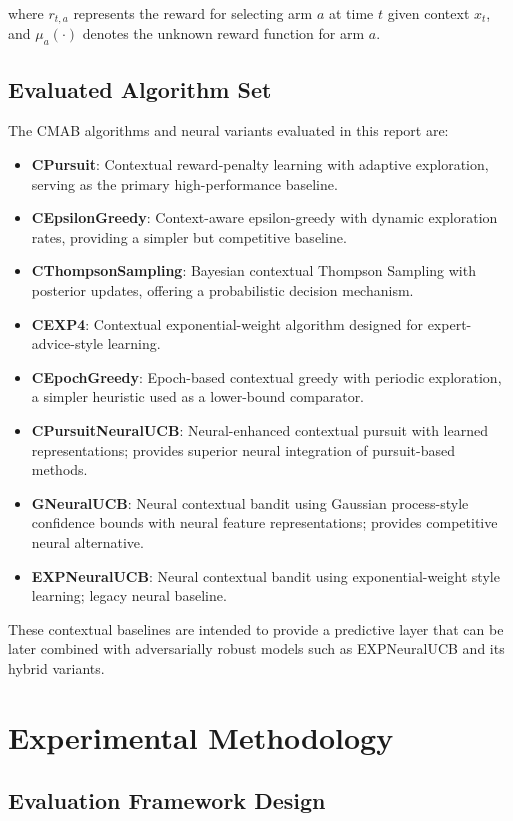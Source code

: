 \documentclass[12pt,a4paper]{article}
\begin{document}
where $r_{t,a}$ represents the reward for selecting arm $a$ at time $t$ given context $x_t$, and $\mu_a(\cdot)$ denotes the unknown reward function for arm $a$.

\subsection{Evaluated Algorithm Set}

The CMAB algorithms and neural variants evaluated in this report are:

\begin{itemize}
\item \textbf{CPursuit}: Contextual reward-penalty learning with adaptive exploration, serving as the primary high-performance baseline.
\item \textbf{CEpsilonGreedy}: Context-aware epsilon-greedy with dynamic exploration rates, providing a simpler but competitive baseline.
\item \textbf{CThompsonSampling}: Bayesian contextual Thompson Sampling with posterior updates, offering a probabilistic decision mechanism.
\item \textbf{CEXP4}: Contextual exponential-weight algorithm designed for expert-advice-style learning.
\item \textbf{CEpochGreedy}: Epoch-based contextual greedy with periodic exploration, a simpler heuristic used as a lower-bound comparator.
\item \textbf{CPursuitNeuralUCB}: Neural-enhanced contextual pursuit with learned representations; provides superior neural integration of pursuit-based methods.
\item \textbf{GNeuralUCB}: Neural contextual bandit using Gaussian process-style confidence bounds with neural feature representations; provides competitive neural alternative.
\item \textbf{EXPNeuralUCB}: Neural contextual bandit using exponential-weight style learning; legacy neural baseline.
\end{itemize}

These contextual baselines are intended to provide a predictive layer that can be later combined with adversarially robust models such as EXPNeuralUCB and its hybrid variants.

\section{Experimental Methodology}

\subsection{Evaluation Framework Design}
\end{document}
